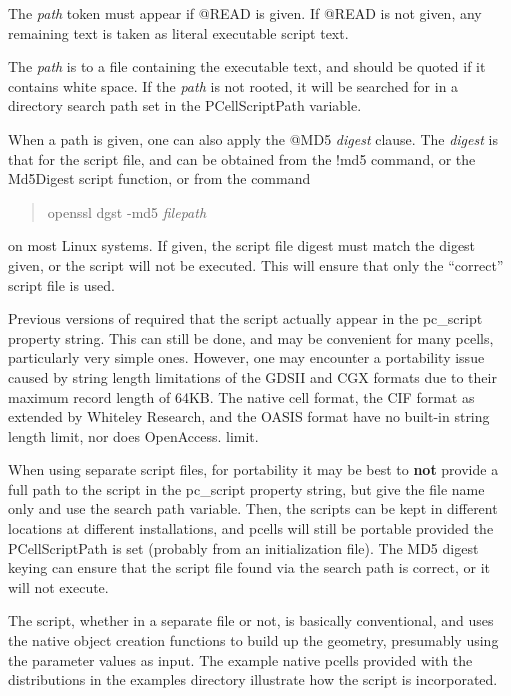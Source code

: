 \begin{description}
The {\it path} token must appear if {\vt @READ} is given.  If {\vt
@READ} is not given, any remaining text is taken as literal executable
script text.

The {\it path} is to a file containing the executable text, and should
be quoted if it contains white space.  If the {\it path} is not
rooted, it will be searched for in a directory search path set in the
{\et PCellScriptPath} variable.

When a path is given, one can also apply the {\vt @MD5} {\it digest}
clause.  The {\it digest} is that for the script file, and can be
obtained from the {\cb !md5} command, or the {\vt Md5Digest} script
function, or from the command
\begin{quote}
{\vt openssl dgst -md5} {\it filepath}
\end{quote}
on most Linux systems.  If given, the script file digest must match
the digest given, or the script will not be executed.  This will
ensure that only the ``correct'' script file is used.
\end{description}

Previous versions of {\Xic} required that the script actually appear
in the {\et pc\_script} property string.  This can still be done, and
may be convenient for many pcells, particularly very simple ones. 
However, one may encounter a portability issue caused by string length
limitations of the GDSII and CGX formats due to their maximum record
length of 64KB.  The native cell format, the CIF format as extended by
Whiteley Research, and the OASIS format have no built-in string length
\ifoa
limit, nor does OpenAccess.
\else
limit.
\fi

When using separate script files, for portability it may be best to
{\bf not} provide a full path to the script in the {\et pc\_script}
property string, but give the file name only and use the search path
variable.  Then, the scripts can be kept in different locations at
different {\Xic} installations, and pcells will still be portable
provided the {\et PCellScriptPath} is set (probably from an
initialization file).  The {\vt MD5} digest keying can ensure that the
script file found via the search path is correct, or it will not
execute.

The script, whether in a separate file or not, is basically
conventional, and uses the native object creation functions to build
up the geometry, presumably using the parameter values as input.  The
example native pcells provided with the {\Xic} distributions in the
examples directory illustrate how the script is incorporated.

